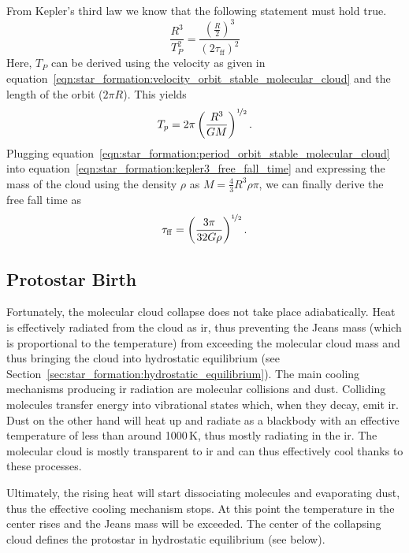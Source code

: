 From Kepler's third law we know that the following statement must hold true.
\begin{equation}
    \frac{R^{3}}{T_P^2} = \frac{\left(\frac{R}{2}\right)^{3}}{(2\tau_\mathrm{ff})^2}
    \label{eqn:star_formation:kepler3_free_fall_time}
\end{equation}
Here, $T_P$ can be derived using the velocity as given in equation~\ref{eqn:star_formation:velocity_orbit_stable_molecular_cloud} and the length of the orbit ($2\pi R$). This yields
\begin{equation}
    T_p = 2\pi \left(\frac{R^{3}}{GM}\right)^{\nicefrac{1}{2}}.
    \label{eqn:star_formation:period_orbit_stable_molecular_cloud}
\end{equation}
Plugging equation~\eqref{eqn:star_formation:period_orbit_stable_molecular_cloud} into equation~\eqref{eqn:star_formation:kepler3_free_fall_time} and expressing the mass of the cloud using the density $\rho$ as $M=\frac{4}{3}R^3\rho \pi$, we can finally derive the free fall time as
\begin{equation}
    \tau_\mathrm{ff} = \left( \frac{3\pi}{32G\rho}\right)^{\nicefrac{1}{2}}.
\end{equation}


\subsection{Protostar Birth}

Fortunately, the molecular cloud collapse does not take place adiabatically. Heat is effectively radiated from the cloud as \ac{ir}, thus preventing the Jeans mass (which is proportional to the temperature) from exceeding the molecular cloud mass and thus bringing the cloud into hydrostatic equilibrium (see Section~\ref{sec:star_formation:hydrostatic_equilibrium}). The main cooling mechanisms producing \ac{ir} radiation are molecular collisions and dust. Colliding molecules transfer energy into vibrational states which, when they decay, emit \ac{ir}. Dust on the other hand will heat up and radiate as a blackbody with an effective temperature of less than around 1000\,K, thus mostly radiating in the \ac{ir}. The molecular cloud is mostly transparent to \ac{ir} and can thus effectively cool thanks to these processes.

Ultimately, the rising heat will start dissociating molecules and evaporating dust, thus the effective cooling mechanism stops. At this point the temperature in the center rises and the Jeans mass will be exceeded. The center of the collapsing cloud defines the protostar in hydrostatic equilibrium (see below).



